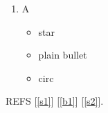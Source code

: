\documentclass{article}
\begin{document}
\begin{enumerate}
\item A
  \begin{itemize}
  \item[$\star$] star\label{s1}
  \item plain bullet\label{b1}
  \item[$\circ$] circ\label{s2}
  \end{itemize}
\end{enumerate}
REFS [\ref{s1}] [\ref{b1}] [\ref{s2}].
\end{document}

